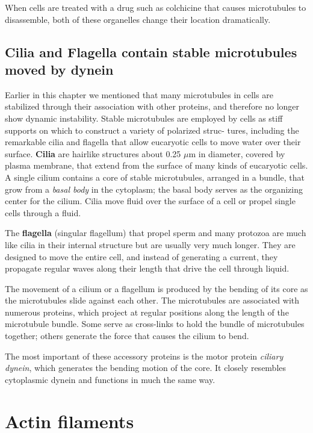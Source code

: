 When cells are treated with a drug such as colchicine
that causes microtubules to disassemble, both of these organelles change
their location dramatically.

\subsection{Cilia and Flagella contain stable microtubules moved by dynein}

Earlier in this chapter we mentioned that many microtubules in cells are
stabilized through their association with other proteins, and therefore no
longer show dynamic instability. Stable microtubules are employed by
cells as stiff supports on which to construct a variety of polarized struc-
tures, including the remarkable cilia and flagella that allow eucaryotic
cells to move water over their surface. \textbf{Cilia} are hairlike structures about
0.25 $\mu$m in diameter, covered by plasma membrane, that extend from
the surface of many kinds of eucaryotic cells. A single
cilium contains a core of stable microtubules, arranged in a bundle, that
grow from a \textit{basal body} in the cytoplasm; the basal body serves as the
organizing center for the cilium.
Cilia move fluid over the surface of a cell or propel single cells through a
fluid.

The \textbf{flagella} (singular flagellum) that propel sperm and many protozoa
are much like cilia in their internal structure but are usually very much
longer. They are designed to move the entire cell, and instead of generating
a current, they propagate regular waves along their length that drive
the cell through liquid.

The movement of a cilium or a flagellum is produced by the bending of
its core as the microtubules slide against each other. The microtubules
are associated with numerous proteins, which project at
regular positions along the length of the microtubule bundle. Some serve
as cross-links to hold the bundle of microtubules together; others generate
the force that causes the cilium to bend.

The most important of these accessory proteins is the motor protein \textit{ciliary dynein},
which generates the bending motion of the core. It closely
resembles cytoplasmic dynein and functions in much the same way.

\section{Actin filaments}

